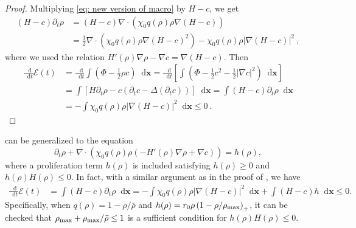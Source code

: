 \documentclass[review,onefignum,onetabnum]{siamart220329}
\newcommand {\bx} { {\mathbf{x}} }
\newcommand*\diff{\mathop{}\!\mathrm{d}}
\begin{document}
 
\begin{proof}
 Multiplying \cref{eq: new version of macro} by $H- c$, we get
\begin{align}
    (H-c)\partial_t\rho & =(H-c)\nabla\cdot(\chi_0 q(\rho)\rho\nabla(H-c))\nonumber\\ & = \frac{1}{2}\nabla\cdot\left( \chi_0 q(\rho)\rho\nabla(H-c)^2\right)-\chi_0 q(\rho)\rho|\nabla(H-c)|^2 \ ,\nonumber
\end{align}
where we used the relation $H'(\rho)\nabla\rho-\nabla c=\nabla(H-c)$.
Then
\begin{align*}
    \frac{\diff}{\diff t}\mathcal{E}(t) & = \frac{\diff }{\diff t}\int \left(\Phi-\frac{1}{2}\rho c \right)\diff \bx
    = \frac{\diff }{\diff t} \left[\int \left(\Phi-\frac{1}{2} c^2 -\frac{1}{2} |\nabla c|^2 \right)\diff \bx\right]\\
    & = \int\left[ H\partial_t\rho - c \left(\partial_t c - \Delta(\partial_t c)\right) \right] \diff \bx  = \int (H - c)\partial_t\rho \diff \bx \\
    &=-\int \chi_0 q(\rho)\rho|\nabla(H-c)|^2\diff \bx\leq 0\ .
\end{align*}
\end{proof}
\begin{remark}\label{rem 6}
 can be generalized to the equation 
\begin{equation*}
    \partial_t\rho+\nabla\cdot(\chi_0 q(\rho)\rho(-H'(\rho)\nabla\rho+\nabla c))=h(\rho),
\end{equation*}
{ where a proliferation term $h(\rho)$ is included satisfying $h(\rho)\ge0$ and $h(\rho)H(\rho)\le0$. 
In fact, with a similar argument as in the proof of , we have 
\begin{align*}
    \frac{\diff}{\diff t}\mathcal{E}(t) & = \int (H - c)\partial_t\rho \diff \bx 
    =-\int \chi_0 q(\rho)\rho|\nabla(H-c)|^2\diff \bx + \int (H-c) h \diff \bx \le 0.
\end{align*}
Specifically, when $q(\rho) = 1 - \rho / \bar{\rho}$ and $h(\rho) = r_0 \rho\left(1 - \rho/\rho_{\rm max}\right)_+$, it can be checked that $\rho_{\rm max} + \rho_{\rm max} / \bar{\rho} \le1$ is a sufficient condition for  $h(\rho)H(\rho)\le0$. }
\end{remark}
\end{document}
